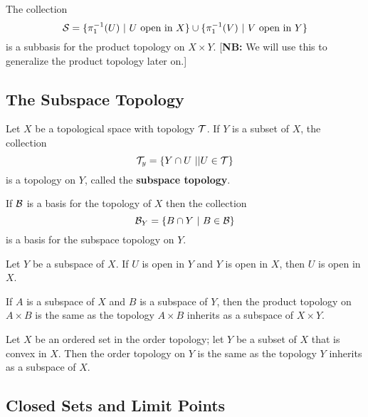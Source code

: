  The collection
\[\CS = \{\pi_1\inv(U)\ |\ U \text{ open in } X\}\cup \{\pi_1\inv(V)\ |\ V \text{ open in } Y\}\]
is a subbasis for the product topology on $X\times Y$. [\textbf{NB:} We will use this to generalize the product topology later on.]

\subsection{The Subspace Topology}\nl
\setcounter{section}{16}

\vs

\dfn Let $X$ be a topological space with topology $\mathcal{T}$. If $Y$ is a subset of $X$, the collection
\[\mathcal{T}_y = \{Y\cap U\ || U\in \mathcal{T}\}\]
is a topology on $Y$, called the \textbf{subspace topology}.

\vs

\begin{lem}
If $\mathcal{B}$ is a basis for the topology of $X$ then the collection
\[\BB_Y = \{B\cap Y\ |\ B\in \BB\}\]
is a basis for the subspace topology on $Y$.
\end{lem}

\vs

\begin{lem}
Let $Y$ be a subspace of $X$. If $U$ is open in $Y$ and $Y$ is open in $X$, then $U$ is open in $X$.
\end{lem}

\vs

\begin{thm}
If $A$ is a subspace of $X$ and $B$ is a subspace of $Y$, then the product topology on $A\times B$ is the same as the topology $A\times B$ inherits as a subspace of $X\times Y$.
\end{thm}

\vs

\begin{thm}
Let $X$ be an ordered set in the order topology; let $Y$ be a subset of $X$ that is convex in $X$. Then the order topology on $Y$ is the same as the topology $Y$ inherits as a subspace of $X$.
\end{thm}

\subsection{Closed Sets and Limit Points}\nl
\setcounter{section}{17}
\setcounter{thm}{0}

